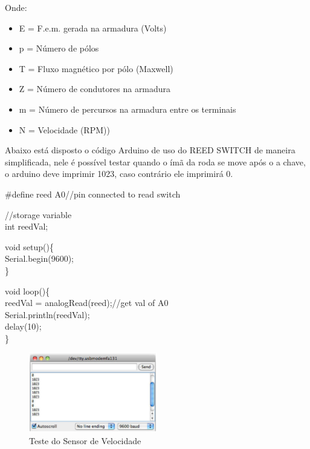 		Onde: 
		\begin{itemize}
			\item E = F.e.m. gerada na armadura (Volts)
			\item p = Número de pólos
			\item T = Fluxo magnético por pólo (Maxwell)
			\item Z = Número de condutores na armadura
			\item m = Número de percursos na armadura entre os terminais
			\item N = Velocidade (RPM))
		\end{itemize}

		Abaixo está disposto o código Arduino de uso do REED SWITCH de maneira simplificada, nele é possível testar quando o ímã da roda se move após o a chave, o arduino deve imprimir 1023, caso contrário ele imprimirá 0.
		
		\#define reed A0//pin connected to read switch
		
		//storage variable\\
		\indent int reedVal;
		
		void setup()\{\\
			\indent \indent Serial.begin(9600);\\
		\indent\}
		
		
		void loop()\{\\
			\indent \indent reedVal = analogRead(reed);//get val of A0\\
			\indent \indent Serial.println(reedVal);\\
			\indent \indent delay(10);\\
		\indent \}
	
			\graphicspath{{figuras/}}
			\begin{figure}[H]
				\centering
				\includegraphics[width=0.5\textwidth]{Figura_9_sensor_velocidade.PNG}
				\caption{Teste do Sensor de Velocidade}
				\label{img:teste_do_sensor_velocidade}
			\end{figure}
			
